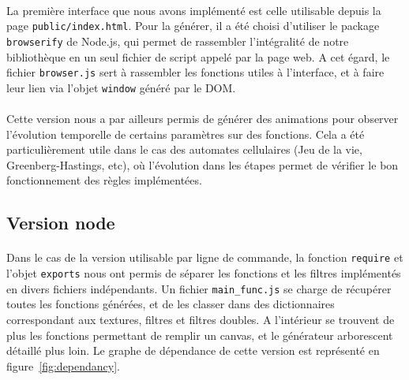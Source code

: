 \documentclass[a4paper]{article}
\begin{document}
\paragraph{}
La première interface que nous avons implémenté est celle utilisable depuis la page \texttt{public/index.html}. Pour la générer, il a été choisi d'utiliser le package \texttt{browserify} de Node.js, qui permet de rassembler l'intégralité de notre bibliothèque en un seul fichier de script appelé par la page web. A cet égard, le fichier \texttt{browser.js} sert à rassembler les fonctions utiles à l'interface, et à faire leur lien via l'objet \texttt{window} généré par le DOM.

\paragraph{}
Cette version nous a par ailleurs permis de générer des animations pour observer l'évolution temporelle de certains paramètres sur des fonctions. Cela a été particulièrement utile dans le cas des automates cellulaires (Jeu de la vie, Greenberg-Hastings, etc), où l'évolution dans les étapes permet de vérifier le bon fonctionnement des règles implémentées.



\subsection{Version node}
\label{sec:node}

\paragraph{}
Dans le cas de la version utilisable par ligne de commande, la fonction \texttt{require} et l'objet \texttt{exports} nous ont permis de séparer les fonctions et les filtres implémentés en divers fichiers indépendants. Un fichier \texttt{main\_func.js} se charge de récupérer toutes les fonctions générées, et de les classer dans des dictionnaires correspondant aux textures, filtres et filtres doubles. A l'intérieur se trouvent de plus les fonctions permettant de remplir un canvas, et le générateur arborescent détaillé plus loin. Le graphe de dépendance de cette version est représenté en figure~\ref{fig:dependancy}.
\end{document}
